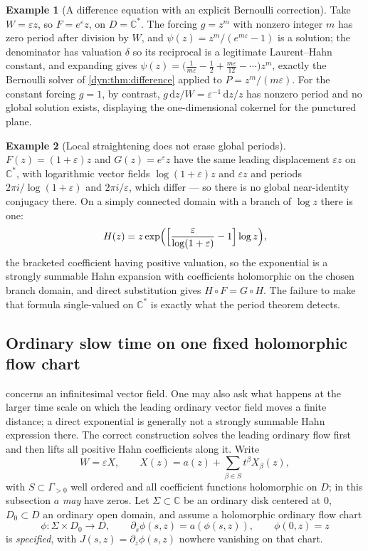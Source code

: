 \documentclass[11pt,letterpaper]{article}
\theoremstyle{definition}
\newtheorem{example}[example]{Example}
\theoremstyle{remark}
\newcommand{\C}{\mathbb C}
\newcommand{\eps}{\varepsilon}
\newcommand{\dd}{\,\mathrm d}
\numberwithin{equation}{section}
\begin{document}
\begin{example}[A difference equation with an explicit Bernoulli correction]
\label{dyn:ex:bernoulli}
Take $W=\eps z$, so $F=e^{\eps}z$, on $D=\C^{*}$. The forcing $g=z^{m}$
with nonzero integer $m$ has zero period after division by $W$, and
$\psi(z)=z^{m}/(e^{m\eps}-1)$ is a solution; the denominator has valuation
$\delta$ so its reciprocal is a legitimate Laurent--Hahn constant, and
expanding gives
$\psi(z)=\bigl(\frac1{m\eps}-\frac12+\frac{m\eps}{12}-\cdots\bigr)z^{m}$,
exactly the Bernoulli solver of \cref{dyn:thm:difference} applied to
$P=z^{m}/(m\eps)$. For the constant forcing $g=1$, by contrast,
$g\dd z/W=\eps^{-1}\dd z/z$ has nonzero period and no global solution
exists, displaying the one-dimensional cokernel for the punctured plane.
\end{example}

\begin{example}[Local straightening does not erase global periods]
\label{dyn:ex:straighten}
$F(z)=(1+\eps)z$ and $G(z)=e^{\eps}z$ have the same leading displacement
$\eps z$ on $\C^{*}$, with logarithmic vector fields
$\log(1+\eps)z$ and $\eps z$ and periods
$2\pi i/\log(1+\eps)$ and $2\pi i/\eps$, which differ --- so there is no
global near-identity conjugacy there. On a simply connected domain with a
branch of $\log z$ there is one:
\[
 H(z)=z\exp\Bigl(\Bigl[\frac{\eps}{\log(1+\eps)}-1\Bigr]\log z\Bigr),
\]
the bracketed coefficient having positive valuation, so the exponential is
a strongly summable Hahn expansion with coefficients holomorphic on the
chosen branch domain, and direct substitution gives $H\circ F=G\circ H$.
The failure to make that formula single-valued on $\C^{*}$ is exactly what
the period theorem detects.
\end{example}

\subsection{Ordinary slow time on one fixed holomorphic flow chart}
\label{dyn:subsec:slowtime}

 concerns an infinitesimal vector field. One may also
ask what happens at the larger time scale on which the leading ordinary
vector field moves a finite distance; a direct exponential is generally not
a strongly summable Hahn expression there. The correct construction solves
the leading ordinary flow first and then lifts all positive Hahn
coefficients along it. Write
\begin{equation}\label{dyn:eq:slow-vector}
 W=\eps X,\qquad X(z)=a(z)+\sum_{\beta\in S}t^{\beta}X_\beta(z),
\end{equation}
with $S\subset\Gamma_{>0}$ well ordered and all coefficient functions
holomorphic on $D$; in this subsection $a$ \emph{may} have zeros. Let
$\Sigma\subset\C$ be an ordinary disk centered at $0$, $D_0\subset D$ an
ordinary open domain, and assume a holomorphic ordinary flow chart
\begin{equation}\label{dyn:eq:ordinary-flow}
 \phi:\Sigma\times D_0\to D,\qquad
 \partial_s\phi(s,z)=a(\phi(s,z)),\qquad \phi(0,z)=z
\end{equation}
is \emph{specified}, with $J(s,z)=\partial_z\phi(s,z)$ nowhere vanishing on
that chart.
\end{document}
